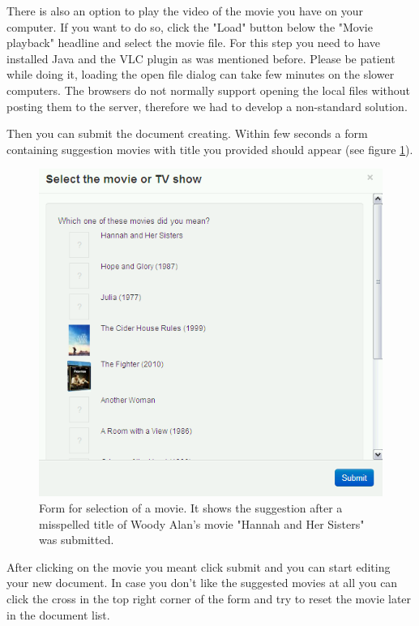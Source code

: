 There is also an option to play the video of the movie you have on your computer. If you want to do so, click the "Load" button below the "Movie playback" headline and select the movie file. For this step you need to have installed Java and the VLC plugin as was mentioned before. Please be patient while doing it, loading the open file dialog can take few minutes on the slower computers. The browsers do not normally support opening the local files without posting them to the server, therefore we had to develop a non-standard solution.

Then you can submit the document creating. Within few seconds a form containing suggestion movies with title you provided should appear (see figure \ref{fig:media_sources}).

\begin{figure}[h]
\begin{center}
\includegraphics[scale=0.4]{figures/user_manual/media_sources.png}
\end{center}
\caption{Form for selection of a movie. It shows the suggestion after a misspelled title of Woody Alan's movie "Hannah and Her Sisters" was submitted.}
\label{fig:media_sources}
\end{figure}

After clicking on the movie you meant click submit and you can start editing your new document. In case you don't like the suggested movies at all you can click the cross in the top right corner of the form and try to reset the movie later in the document list.

